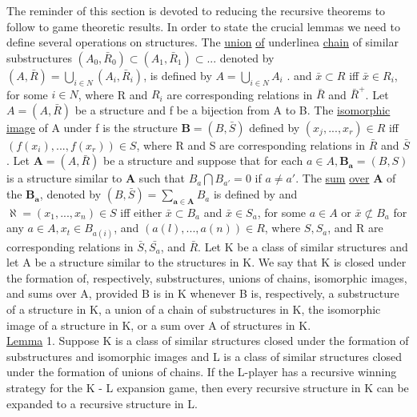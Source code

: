 \documentclass[twoside]{article}
\begin{document}
The reminder of this section is devoted to reducing the recursive
theorems to follow to game theoretic results.    In order to state the crucial
lemmas we need to define several operations on structures. The \underline{union} \underline{of} underline{a}
\underline{chain} of similar substructures $(A_0,\bar{R}_0) \subset (A_1,\bar{R}_1) \subset ...$ denoted by
$(A,\bar{R}) =  \bigcup_{i\in N}(A_i,\bar{R}_i)$,  is defined by   $A = \bigcup_{i\in N} A_i$ . and   $\bar{x} \subset R$ iff $\bar{x} \in R_i$, for
some   $i \in N$, where   R   and   $R_i$    are corresponding relations in   $\bar{R}$   and   $\bar{R}^+$.
Let   $A = (A,\bar{R})$   be a structure and   f   be   a bijection from A to   B. The
\newcommand{\meph}{\mathbf}
\underline{isomorphic} \underline{image} of A under f is the structure   $\meph{B} = (B,\bar{S})$ defined by
$(x_j,...,x_r)\in R$ iff $(f(x_i),...,f(x_r)) \in S$, where   R   and   S   are corresponding
relations in   $\bar{R}$   and  $\bar{S}$. Let   $\meph{A} = (A,\bar{R})$   be a structure and suppose that for
each   $a\in A, \meph{B_a}   = (B, S)$ is a structure similar to $\meph{A}$ such that $B_a \bigcap B_{a'} = 0$ if $a \neq a'$.
The \underline{sum} \underline{over}   $\meph{A}$   of the $\meph{B_a}$, denoted by   $(B,\bar{S}) =  \sum_{\meph{a}\in \meph{A}} B_a$   is defined by
and $\aleph = (x_1,..., x_n)\in S$ iff either $\bar{x} \subset B_a$   and $\bar{x} \in S_a$, for some $a \in A$
or $\bar{x} \not \subset B_a$   for any $a \in A, x_t \in B_{a(i)}$, and   $(a(l),. .. ,a(n)) \in R$,   where   $S, S_a$, and
R   are corresponding relations in $\bar{S}, \bar{S_a}$, and $\bar{R}$.
Let K be a   class	of similar structures and let A be a structure similar to the structures in	K. 
We say that   K   is closed under the formation of, respectively, substructures,
unions of chains, isomorphic images, and sums over   A, provided   B	is in K
whenever   B   is, respectively, a substructure of a structure in   K,	a union of
a chain of substructures in   K, the isomorphic image of a structure	in   K, or
a sum over A   of structures in K.\\
\newline
\underline{Lemma} 1.   Suppose   K   is a class of similar structures closed under	the
formation of substructures and isomorphic images and   L   is a class	of similar
structures closed under the formation of unions of chains.    If the	L-player
has a recursive winning strategy for the   K - L   expansion game,  then every
recursive structure in   K   can be expanded to a recursive structure	in L.\\
\end{document}

